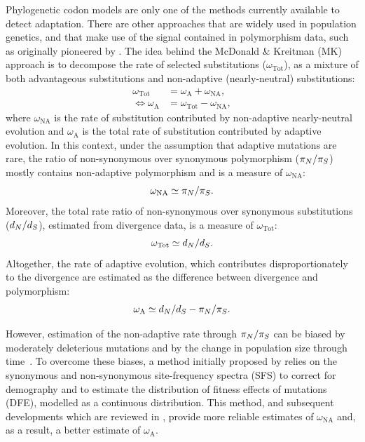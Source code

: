 Phylogenetic codon models are only one of the methods currently available to detect adaptation.
There are other approaches that are widely used in population genetics, and that make use of the signal contained in polymorphism data, such as originally pioneered by \citet{McDonald1991}.
The idea behind the McDonald \& Kreitman (\acrshort{MK}) approach is to decompose the rate of selected substitutions ($\omega_{\text{Tot}}$), as a mixture of both advantageous substitutions and non-adaptive (nearly-neutral) substitutions:
\begin{align}
    \omega_{\text{Tot}} & = \omega_{\text{A}} + \omega_{\text{NA}}, \\
    \iff \omega_{\text{A}} & = \omega_{\text{Tot}} - \omega_{\text{NA}},
\end{align}
where $\omega_{\text{NA}}$ is the rate of substitution contributed by non-adaptive nearly-neutral evolution and $\omega_{\text{A}}$ is the total rate of substitution contributed by adaptive evolution.
In this context, under the assumption that adaptive mutations are rare, the ratio of non-synonymous over synonymous polymorphism ($\pi_N / \pi_S$) mostly contains non-adaptive polymorphism and is a measure of $\omega_{\text{NA}}$:
\begin{equation}
    \omega_{\text{NA}} \simeq \pi_N / \pi_S.
\end{equation}
Moreover, the total rate ratio of non-synonymous over synonymous substitutions ($d_N / d_S$), estimated from divergence data, is a measure of $\omega_{\text{Tot}}$:
\begin{equation}
    \omega_{\text{Tot}} \simeq d_N / d_S.
\end{equation}
Altogether, the rate of adaptive evolution, which contributes disproportionately to the divergence are estimated as the difference between divergence and polymorphism:
\begin{equation}
    \omega_{\text{A}} \simeq d_N / d_S - \pi_N / \pi_S.
\end{equation}

However, estimation of the non-adaptive rate through $\pi_N / \pi_S$ can be biased by moderately deleterious mutations and by the change in population size through time~\citep{eyre-walker_changing_2002}.
To overcome these biases, a method initially proposed by \citet{eyre-walker_estimating_2009, Galtier2016} relies on the synonymous and non-synonymous site-frequency spectra (\acrshort{SFS}) to correct for demography and to estimate the distribution of fitness effects of mutations (\acrshort{DFE}), modelled as a continuous distribution.
This method, and subsequent developments which are reviewed in \citet{Moutinho2019a}, provide more reliable estimates of $\omega_{\text{NA}}$ and, as a result, a better estimate of $\omega_{\text{A}}$.

